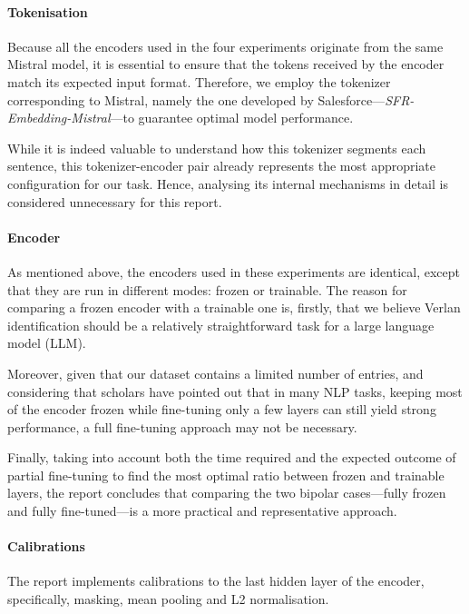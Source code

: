 \documentclass[12pt]{article}
\begin{document}
\paragraph{Tokenisation}
Because all the encoders used in the four experiments originate from the same Mistral model, it is essential to ensure that the tokens received by the encoder match its expected input format. Therefore, we employ the tokenizer corresponding to Mistral, namely the one developed by Salesforce\;---\;\textit{SFR-Embedding-Mistral}\;---\;to guarantee optimal model performance.

While it is indeed valuable to understand how this tokenizer segments each sentence, this tokenizer-encoder pair already represents the most appropriate configuration for our task. Hence, analysing its internal mechanisms in detail is considered unnecessary for this report.

\paragraph{Encoder}
As mentioned above, the encoders used in these experiments are identical, except that they are run in different modes: frozen or trainable. The reason for comparing a frozen encoder with a trainable one is, firstly, that we believe Verlan identification should be a relatively straightforward task for a large language model (LLM). 

Moreover, given that our dataset contains a limited number of entries, and considering that scholars have pointed out that in many NLP tasks, keeping most of the encoder frozen while fine-tuning only a few layers can still yield strong performance\cite{lodha2023surgical}, a full fine-tuning approach may not be necessary. 

Finally, taking into account both the time required and the expected outcome of partial fine-tuning to find the most optimal ratio between frozen and trainable layers, the report concludes that comparing the two bipolar cases\;---\;fully frozen and fully fine-tuned\;---\;is a more practical and representative approach.

\paragraph{Calibrations}

The report implements calibrations to the last hidden layer of the encoder, specifically, masking, mean pooling and L2 normalisation. 
\end{document}
